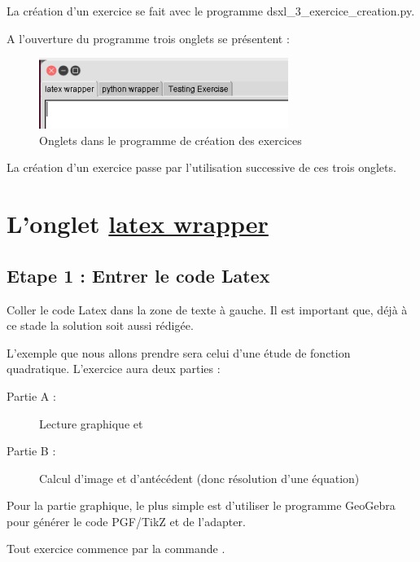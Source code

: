 
La création d'un exercice se fait avec le programme dsxl\_3\_exercice\_creation.py.

A l'ouverture du programme trois onglets se présentent :

\begin{figure}[h]
 \centering
 \includegraphics{./images/creation_exercice_01.png}
 \caption{Onglets dans le programme de création des exercices}
 \label{fig:01}
\end{figure}

La création d'un exercice passe par l'utilisation successive de ces trois onglets. 

\section{L'onglet \underline{latex wrapper}}

\subsection{Etape 1 : Entrer le code Latex}
Coller le code Latex dans la zone de texte à gauche. Il est important que, déjà à ce stade la solution soit aussi rédigée. 

L'exemple que nous allons prendre sera celui d'une étude de fonction quadratique. L'exercice aura deux parties : 
\begin{description}
 \item[Partie A :] Lecture graphique et
 \item[Partie B :] Calcul d'image et d'antécédent (donc résolution d'une équation)
\end{description}

\begin{remarque}
 Pour la partie graphique, le plus simple est d'utiliser le programme GeoGebra pour générer le code PGF/TikZ et de l'adapter. 
\end{remarque}
 
 \begin{remarque}
 Tout exercice commence par la commande  . 
\end{remarque}
 
